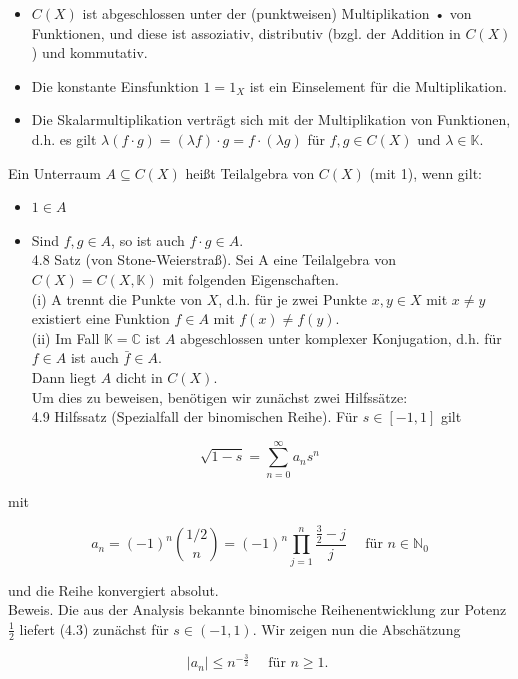 \documentclass[10pt, letterpaper]{article}
\begin{document}
\begin{itemize}
  \item $C(X)$ ist abgeschlossen unter der (punktweisen) Multiplikation • von Funktionen, und diese ist assoziativ, distributiv (bzgl. der Addition in $C(X)$ ) und kommutativ.
  \item Die konstante Einsfunktion $1=1_{X}$ ist ein Einselement für die Multiplikation.
  \item Die Skalarmultiplikation verträgt sich mit der Multiplikation von Funktionen, d.h. es gilt $\lambda(f \cdot g)=(\lambda f) \cdot g=f \cdot(\lambda g)$ für $f, g \in C(X)$ und $\lambda \in \mathbb{K}$.
\end{itemize}

Ein Unterraum $A \subseteq C(X)$ heißt Teilalgebra von $C(X)$ (mit 1), wenn gilt:

\begin{itemize}
  \item $1 \in A$
  \item Sind $f, g \in A$, so ist auch $f \cdot g \in A$.\\
4.8 Satz (von Stone-Weierstraß). Sei A eine Teilalgebra von $C(X)=C(X, \mathbb{K})$ mit folgenden Eigenschaften.\\
(i) A trennt die Punkte von $X$, d.h. für je zwei Punkte $x, y \in X$ mit $x \neq y$ existiert eine Funktion $f \in A$ mit $f(x) \neq f(y)$.\\
(ii) Im Fall $\mathbb{K}=\mathbb{C}$ ist $A$ abgeschlossen unter komplexer Konjugation, d.h. für $f \in A$ ist auch $\bar{f} \in A$.\\
Dann liegt $A$ dicht in $C(X)$.\\
Um dies zu beweisen, benötigen wir zunächst zwei Hilfssätze:\\
4.9 Hilfssatz (Spezialfall der binomischen Reihe). Für $s \in[-1,1]$ gilt
\end{itemize}

$$
\sqrt{1-s}=\sum_{n=0}^{\infty} a_{n} s^{n}
$$

mit

$$
a_{n}=(-1)^{n}\binom{1 / 2}{n}=(-1)^{n} \prod_{j=1}^{n} \frac{\frac{3}{2}-j}{j} \quad \text { für } n \in \mathbb{N}_{0}
$$

und die Reihe konvergiert absolut.\\
Beweis. Die aus der Analysis bekannte binomische Reihenentwicklung zur Potenz $\frac{1}{2}$ liefert (4.3) zunächst für $s \in(-1,1)$. Wir zeigen nun die Abschätzung

$$
\left|a_{n}\right| \leq n^{-\frac{3}{2}} \quad \text { für } n \geq 1 \text {. }
$$
\end{document}
